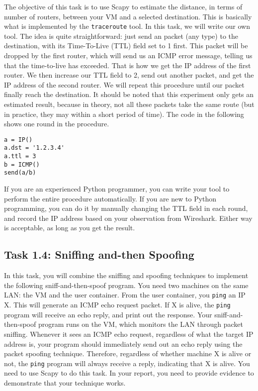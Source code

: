 The objective of this task is to use Scapy to estimate the distance, in
terms of number of routers, between your VM and a selected destination.  
This is basically what is implemented by the \texttt{traceroute} tool. 
In this task, we will write our own tool. The idea is quite
straightforward: just send an packet (any type) to the destination, with
its Time-To-Live (TTL) field set to 1 first. This packet will be dropped by
the first router, which will send us an ICMP error message, telling us 
that the time-to-live has exceeded. That is how we get the IP address of
the first router. We then increase our TTL field to 2, send out another
packet, and get the IP address of the second router. We will repeat this
procedure until our packet finally reach the destination. It should be
noted that this experiment only gets an estimated result, because in
theory, not all these packets take the same route (but in practice, they may
within a short period of time). The code in the following shows one round 
in the procedure. 


\begin{lstlisting}
a = IP()
a.dst = '1.2.3.4'
a.ttl = 3
b = ICMP()
send(a/b)
\end{lstlisting}


If you are an experienced Python programmer, you can write your tool 
to perform the entire procedure automatically. If you are new to Python
programming, you can do it by manually changing the TTL field in 
each round, and record the IP address based on your observation 
from Wireshark. Either way is acceptable, as long as you get the result. 


\subsection{Task 1.4: Sniffing and-then Spoofing}  

In this task, you will combine the sniffing and spoofing techniques
to implement the following sniff-and-then-spoof program.
You need two machines on the same LAN: the VM and the user container. 
From the user container, you
{\tt ping} an IP X. This will generate an ICMP echo
request packet. If X is alive, the {\tt ping} program will receive
an echo reply, and print out the response. Your sniff-and-then-spoof
program runs on the VM, which monitors the LAN through packet sniffing. Whenever it
sees an ICMP echo request, regardless of what the target IP address is,
your program should immediately send out an echo reply using the
packet spoofing technique. Therefore, regardless of whether machine X
is alive or not, the {\tt ping} program will always receive
a reply, indicating that X is alive. You need to use Scapy
to do this task. In your report, you need to provide evidence to demonstrate 
that your technique works. 

